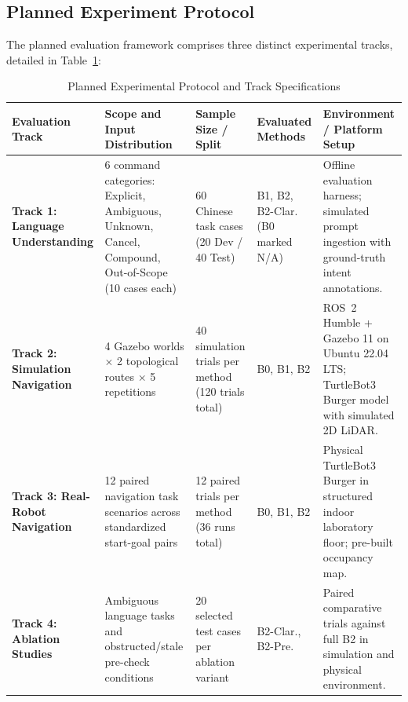 \documentclass[conference]{IEEEtran}
\begin{document}
\subsection{Planned Experiment Protocol}
The planned evaluation framework comprises three distinct experimental tracks, detailed in Table~\ref{tab:protocol}:

\begin{table}[t]
\caption{Planned Experimental Protocol and Track Specifications}
\label{tab:protocol}
\centering
\scriptsize
\setlength{\tabcolsep}{3.5pt}
\begin{tabular}{p{2.2cm}p{3.2cm}p{2.6cm}p{2.5cm}p{5.0cm}}
\toprule
\textbf{Evaluation Track} & \textbf{Scope and Input Distribution} & \textbf{Sample Size / Split} & \textbf{Evaluated Methods} & \textbf{Environment / Platform Setup} \\
\midrule
\textbf{Track 1: Language Understanding} & 6 command categories: Explicit, Ambiguous, Unknown, Cancel, Compound, Out-of-Scope (10 cases each) & 60 Chinese task cases (20 Dev / 40 Test) & B1, B2, B2-Clar. (B0 marked N/A) & Offline evaluation harness; simulated prompt ingestion with ground-truth intent annotations. \\
\addlinespace[3pt]
\textbf{Track 2: Simulation Navigation} & 4 Gazebo worlds $\times$ 2 topological routes $\times$ 5 repetitions & 40 simulation trials per method (120 trials total) & B0, B1, B2 & ROS~2 Humble + Gazebo 11 on Ubuntu 22.04 LTS; TurtleBot3 Burger model with simulated 2D LiDAR. \\
\addlinespace[3pt]
\textbf{Track 3: Real-Robot Navigation} & 12 paired navigation task scenarios across standardized start-goal pairs & 12 paired trials per method (36 runs total) & B0, B1, B2 & Physical TurtleBot3 Burger in structured indoor laboratory floor; pre-built occupancy map. \\
\addlinespace[3pt]
\textbf{Track 4: Ablation Studies} & Ambiguous language tasks and obstructed/stale pre-check conditions & 20 selected test cases per ablation variant & B2-Clar., B2-Pre. & Paired comparative trials against full B2 in simulation and physical environment. \\
\bottomrule
\end{tabular}
\end{table}
\end{document}
